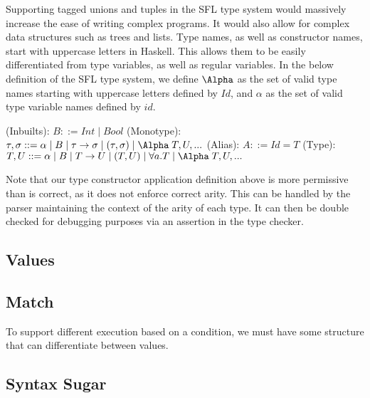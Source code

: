 Supporting tagged unions and tuples in the SFL type system would massively increase the ease of writing complex programs. It would also allow for complex data structures such as trees and lists. 
Type names, as well as constructor names, start with uppercase letters in Haskell. This allows them to be easily differentiated from type variables, as well as regular variables. 
In the below definition of the SFL type system, we define \(\Alpha\) as the set of valid type names starting with uppercase letters defined by \(Id\), and \(\alpha\) as the set of valid type variable names defined by \(id\). 

\begin{syntax}
(Inbuilts): \(B::=Int\mid Bool\)\newline
(Monotype): \(\tau, \sigma ::= \alpha \mid B \mid \tau \rightarrow \sigma \mid (\tau, \sigma) \mid \Alpha \;T, U,...\)\newline
(Alias): \(A ::= Id = T\)\newline
(Type): \(T, U ::= \alpha \mid B \mid T \rightarrow U \mid (T, U) \mid \forall a. T \mid \Alpha \;T, U,...\)
\end{syntax}
Note that our type constructor application definition above is more permissive than is correct, as it does not enforce correct arity. This can be handled by the parser maintaining the context of the arity of each type. It can then be double checked for debugging purposes via an assertion in the type checker. 

\subsection{Values}


\subsection{Match}
To support different execution based on a condition, we must have some structure that can differentiate between values. 

\subsection{Syntax Sugar}